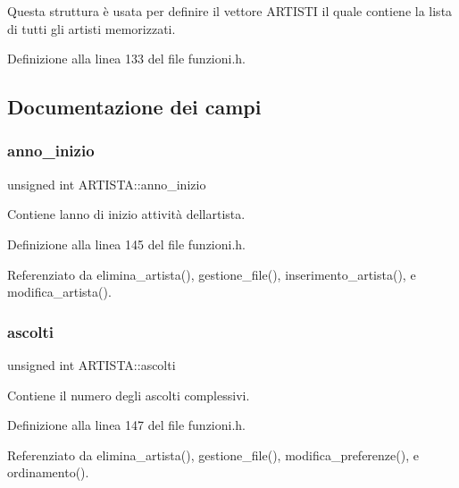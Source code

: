 Questa struttura è usata per definire il vettore A\+R\+T\+I\+S\+TI il quale contiene la lista di tutti gli artisti memorizzati. 

Definizione alla linea 133 del file funzioni.\+h.



\subsection{Documentazione dei campi}
\mbox{\label{struct_a_r_t_i_s_t_a_a776bd83463cbbd70affcbc08b7687675}} 
\subsubsection{\texorpdfstring{anno\+\_\+inizio}{anno\_inizio}}
{\footnotesize\ttfamily unsigned int A\+R\+T\+I\+S\+T\+A\+::anno\+\_\+inizio}

Contiene l\textquotesingle{}anno di inizio attività dell\textquotesingle{}artista. 

Definizione alla linea 145 del file funzioni.\+h.



Referenziato da elimina\+\_\+artista(), gestione\+\_\+file(), inserimento\+\_\+artista(), e modifica\+\_\+artista().

\mbox{\label{struct_a_r_t_i_s_t_a_a94634853ac282b23729897e105865590}} 
\subsubsection{\texorpdfstring{ascolti}{ascolti}}
{\footnotesize\ttfamily unsigned int A\+R\+T\+I\+S\+T\+A\+::ascolti}

Contiene il numero degli ascolti complessivi. 

Definizione alla linea 147 del file funzioni.\+h.



Referenziato da elimina\+\_\+artista(), gestione\+\_\+file(), modifica\+\_\+preferenze(), e ordinamento().

\mbox{\label{struct_a_r_t_i_s_t_a_a614effe8a3285fd1b6bd29e7bff7ff72}} 
